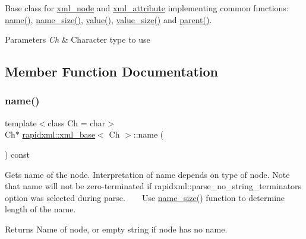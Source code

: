 Base class for \mbox{\hyperlink{classrapidxml_1_1xml__node}{xml\+\_\+node}} and \mbox{\hyperlink{classrapidxml_1_1xml__attribute}{xml\+\_\+attribute}} implementing common functions\+: \mbox{\hyperlink{classrapidxml_1_1xml__base_aef8ae147fbee59209f714274afc80dc4}{name()}}, \mbox{\hyperlink{classrapidxml_1_1xml__base_a20c8ffbe0c7a0b4231681ab8b99330a4}{name\+\_\+size()}}, \mbox{\hyperlink{classrapidxml_1_1xml__base_a6af65de5e59ac497cd69838f8a89d602}{value()}}, \mbox{\hyperlink{classrapidxml_1_1xml__base_a2eb123d471b1567fa4832b6ee2b75493}{value\+\_\+size()}} and \mbox{\hyperlink{classrapidxml_1_1xml__base_aa807062868d671a8c798d9d1bf016988}{parent()}}. 
\begin{DoxyParams}{Parameters}
{\em Ch} & Character type to use \\
\hline
\end{DoxyParams}


\subsection{Member Function Documentation}
\mbox{\label{classrapidxml_1_1xml__base_aef8ae147fbee59209f714274afc80dc4}} 
\subsubsection{\texorpdfstring{name()}{name()}\hspace{0.1cm}{\footnotesize\ttfamily [1/3]}}
{\footnotesize\ttfamily template$<$class Ch  = char$>$ \\
Ch$\ast$ \mbox{\hyperlink{classrapidxml_1_1xml__base}{rapidxml\+::xml\+\_\+base}}$<$ Ch $>$\+::name (\begin{DoxyParamCaption}{ }\end{DoxyParamCaption}) const\hspace{0.3cm}{\ttfamily [inline]}}

Gets name of the node. Interpretation of name depends on type of node. Note that name will not be zero-\/terminated if rapidxml\+::parse\+\_\+no\+\_\+string\+\_\+terminators option was selected during parse. ~\newline
~\newline
 Use \mbox{\hyperlink{classrapidxml_1_1xml__base_a20c8ffbe0c7a0b4231681ab8b99330a4}{name\+\_\+size()}} function to determine length of the name. \begin{DoxyReturn}{Returns}
Name of node, or empty string if node has no name. 
\end{DoxyReturn}
\mbox{\label{classrapidxml_1_1xml__base_ae55060ae958c6e6465d6c8db852ec6ce}} 
